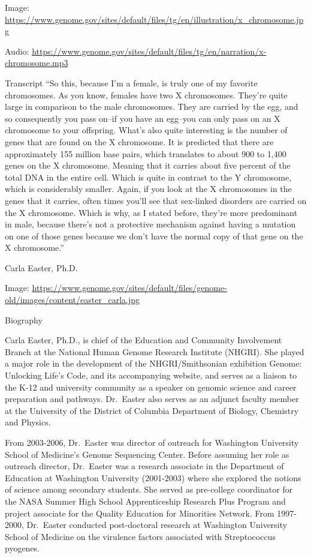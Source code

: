 \documentclass[
]{book}
\begin{document}
Image: \url{https://www.genome.gov/sites/default/files/tg/en/illustration/x_chromosome.jpg}

Audio: \url{https://www.genome.gov/sites/default/files/tg/en/narration/x-chromosome.mp3}

Transcript
``So this, because I'm a female, is truly one of my favorite chromosomes. As you know, females have two X chromosomes. They're quite large in comparison to the male chromosomes. They are carried by the egg, and so consequently you pass on--if you have an egg--you can only pass on an X chromosome to your offspring. What's also quite interesting is the number of genes that are found on the X chromosome. It is predicted that there are approximately 155 million base pairs, which translates to about 900 to 1,400 genes on the X chromosome. Meaning that it carries about five percent of the total DNA in the entire cell. Which is quite in contrast to the Y chromosome, which is considerably smaller. Again, if you look at the X chromosomes in the genes that it carries, often times you'll see that sex-linked disorders are carried on the X chromosome. Which is why, as I stated before, they're more predominant in male, because there's not a protective mechanism against having a mutation on one of those genes because we don't have the normal copy of that gene on the X chromosome.''

Carla Easter, Ph.D.

Image: \url{https://www.genome.gov/sites/default/files/genome-old/images/content/easter_carla.jpg}

Biography

Carla Easter, Ph.D., is chief of the Education and Community Involvement Branch at the National Human Genome Research Institute (NHGRI). She played a major role in the development of the NHGRI/Smithsonian exhibition Genome: Unlocking Life's Code, and its accompanying website, and serves as a liaison to the K-12 and university community as a speaker on genomic science and career preparation and pathways. Dr.~Easter also serves as an adjunct faculty member at the University of the District of Columbia Department of Biology, Chemistry and Physics.

From 2003-2006, Dr.~Easter was director of outreach for Washington University School of Medicine's Genome Sequencing Center. Before assuming her role as outreach director, Dr.~Easter was a research associate in the Department of Education at Washington University (2001-2003) where she explored the notions of science among secondary students. She served as pre-college coordinator for the NASA Summer High School Apprenticeship Research Plus Program and project associate for the Quality Education for Minorities Network. From 1997-2000, Dr.~Easter conducted post-doctoral research at Washington University School of Medicine on the virulence factors associated with Streptococcus pyogenes.
\end{document}
